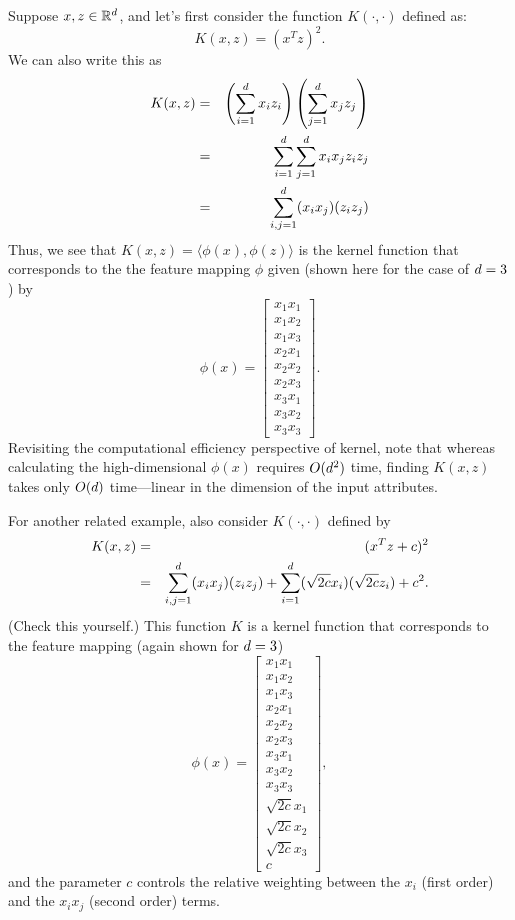 \documentclass{article}
\begin{document}

Suppose $x,z \in {\mathbb R}^{d}$, and let's first consider the function $K(\cdot, \cdot)$ defined as:
\[
K(x,z) = (x^Tz)^2.
\]
We can also write this as
\begin{eqnarray*}
	K(x,z) &=& \left(\sum_{i=1}^{d} x_i z_i\right) \left(\sum_{j=1}^{d} x_j z_j\right) \\
	&=& \sum_{i=1}^{d} \sum_{j=1}^{d} x_i x_j z_i z_j \\
	&=& \sum_{i,j = 1}^{{d}} (x_i x_j) (z_i z_j)
\end{eqnarray*}
Thus, we see that $K(x,z) = \langle \phi(x), \phi(z)\rangle$ is the kernel function that corresponds to the the feature mapping $\phi$
given (shown here for the case of ${d}=3$) by
\[
\phi(x) = \left[\begin{array}{c}
x_1 x_1 \\
x_1 x_2 \\
x_1 x_3 \\
x_2 x_1 \\
x_2 x_2 \\
x_2 x_3 \\
x_3 x_1 \\
x_3 x_2 \\
x_3 x_3
\end{array}\right].
\]
Revisiting the computational efficiency perspective of kernel, note that whereas calculating the high-dimensional $\phi(x)$ requires $O({d}^2)$ time,
finding $K(x,z)$ takes only $O({d})$ time---linear in the dimension of the input attributes.

For another related example, also consider $K(\cdot, \cdot)$ defined by
\begin{eqnarray*}
	K(x,z) &=& (x^Tz +c)^2 \\
	&=& \sum_{i,j = 1}^{{d}} (x_i x_j) (z_i z_j) + \sum_{i=1}^{d} (\sqrt{2c} x_i) (\sqrt{2c} z_i) + c^2.
\end{eqnarray*}
(Check this yourself.)  This function $K$ is a kernel function that corresponds to the feature mapping (again shown for ${d}=3$)
\[
\phi(x) = \left[\begin{array}{c}
x_1 x_1 \\
x_1 x_2 \\
x_1 x_3 \\
x_2 x_1 \\
x_2 x_2 \\
x_2 x_3 \\
x_3 x_1 \\
x_3 x_2 \\
x_3 x_3 \\
\sqrt{2c} x_1 \\
\sqrt{2c} x_2 \\
\sqrt{2c} x_3 \\
c
\end{array}\right],
\]
and the parameter $c$ controls the relative weighting between the $x_i$ (first order) and the
$x_i x_j$ (second order) terms.
\end{document}
